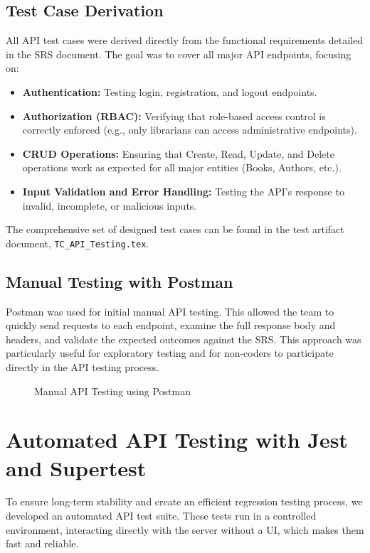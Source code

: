 \subsection{Test Case Derivation}
All API test cases were derived directly from the functional requirements detailed in the SRS document.  The goal was to cover all major API endpoints, focusing on:
\begin{itemize}[noitemsep]
    \item \textbf{Authentication:} Testing login, registration, and logout endpoints.
    \item \textbf{Authorization (RBAC):} Verifying that role-based access control is correctly enforced (e.g., only librarians can access administrative endpoints).
    \item \textbf{CRUD Operations:} Ensuring that Create, Read, Update, and Delete operations work as expected for all major entities (Books, Authors, etc.).
    \item \textbf{Input Validation and Error Handling:} Testing the API's response to invalid, incomplete, or malicious inputs.
\end{itemize}
The comprehensive set of designed test cases can be found in the test artifact document, \texttt{TC\_API\_Testing.tex}.

\subsection{Manual Testing with Postman}
Postman was used for initial manual API testing. This allowed the team to quickly send requests to each endpoint, examine the full response body and headers, and validate the expected outcomes against the SRS. This approach was particularly useful for exploratory testing and for non-coders to participate directly in the API testing process.

\begin{figure}[H]
    \centering
    \caption{Manual API Testing using Postman}
    \label{fig:postman_execution}
\end{figure}

\section{Automated API Testing with Jest and Supertest}
To ensure long-term stability and create an efficient regression testing process, we developed an automated API test suite. These tests run in a controlled environment, interacting directly with the server without a UI, which makes them fast and reliable.

